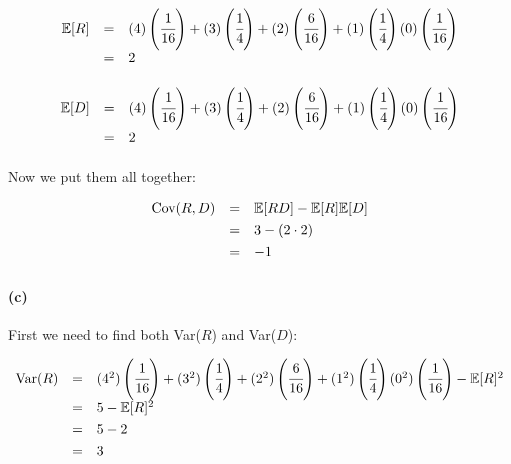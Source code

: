 \documentclass[a4paper]{article}
\begin{document}
\begin{equation}
\begin{array}{rll}
\mathbb{E}[R] & = & (4) \left( \cfrac{1}{16} \right) + (3) \left( \cfrac{1}{4} \right) + (2) \left( \cfrac{6}{16} \right) + (1) \left( \cfrac{1}{4} \right) (0) \left( \cfrac{1}{16} \right) \\[.05in]
& = & 2 \\[.05in]
\end{array}
\end{equation}

\begin{equation}
\begin{array}{rll}
\mathbb{E}[D] & = & (4) \left( \cfrac{1}{16} \right) + (3) \left( \cfrac{1}{4} \right) + (2) \left( \cfrac{6}{16} \right) + (1) \left( \cfrac{1}{4} \right) (0) \left( \cfrac{1}{16} \right) \\[.05in]
& = & 2 \\[.05in]
\end{array}
\end{equation}

Now we put them all together:

\begin{equation}
\begin{array}{rll}
\mbox{Cov}(R, D) & = & \mathbb{E}[RD]-\mathbb{E}[R] \mathbb{E}[D] \\[.05in]
& = & 3 - (2 \cdot 2) \\[.05in]
& = & -1 \\[.05in]
\end{array}
\end{equation}


\paragraph{(c)}

First we need to find both Var($R$) and Var($D$):

\begin{equation}
\begin{array}{rll}
\mbox{Var}(R) & = & (4^2) \left( \cfrac{1}{16} \right) + (3^2) \left( \cfrac{1}{4} \right) + (2^2) \left( \cfrac{6}{16} \right) + (1^2) \left( \cfrac{1}{4} \right) (0^2) \left( \cfrac{1}{16} \right) - \mathbb{E}[R]^2 \\[.05in]
& = & 5 - \mathbb{E}[R]^2 \\[.05in]
& = & 5 - 2 \\[.05in]
& = & 3 \\[.05in]
\end{array}
\end{equation}
\end{document}
